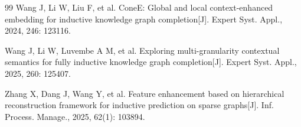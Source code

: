 \documentclass[preprint,12pt]{elsarticle}
\begin{document}
\begin{thebibliography}{99}
Wang J, Li W, Liu F, et al.
ConeE: Global and local context-enhanced embedding for inductive knowledge graph completion[J]. Expert Syst. Appl., 2024, 246: 123116.

Wang J, Li W, Luvembe A M, et al.
Exploring multi-granularity contextual semantics for fully inductive knowledge graph completion[J]. Expert Syst. Appl., 2025, 260: 125407.

Zhang X, Dang J, Wang Y, et al.
Feature enhancement based on hierarchical reconstruction framework for inductive prediction on sparse graphs[J]. Inf. Process. Manage., 2025, 62(1): 103894.


\end{thebibliography}
\end{document}
